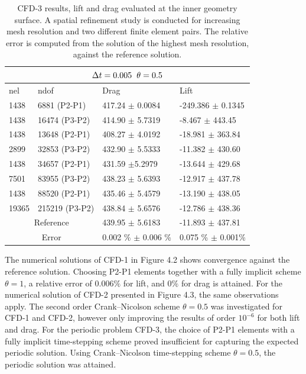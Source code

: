 \begin{table}[h!]
\centering
\label{CFD-32 Results}
 \begin{tabular}{ |p{1cm}||p{2.9cm}|p{3.3cm}|p{3.3cm}|}
  \hline
  \multicolumn{4}{|c|}{$\Delta t = 0.005 \hspace{2mm} \theta = 0.5$} \\
   \hline
nel & ndof & Drag  & Lift \\
\hline
 1438    & 6881  (P2-P1)   &  417.24  $\pm$  0.0084 & -249.386   $\pm$ 0.1345  \\
 1438    & 16474 (P3-P2)   & 414.90     $\pm$  5.7319 & -8.467 $\pm$  443.45  \\
\hline
 1438    &13648  (P2-P1)   & 408.27   $\pm$ 4.0192 & -18.981   $\pm$ 363.84 \\
 2899    &  32853 (P3-P2)   & 432.90      $\pm$  5.5333 & -11.382      $\pm$  430.60 \\
 \hline
 1438    & 34657  (P2-P1)   & 431.59 $\pm$5.2979 & -13.644   $\pm$ 429.68 \\
 7501    & 83955 (P3-P2)  & 438.23      $\pm$  5.6393 & -12.917 $\pm$  437.78 \\
 \hline
 1438    & 88520  (P2-P1)   & 435.46  $\pm$ 5.4579 & -13.190   $\pm$ 438.05 \\
 19365   & 215219 (P3-P2)  & 438.84    $\pm$  5.6576 & -12.786      $\pm$  438.36 \\
\hline
 \multicolumn{2}{|c|}{Reference}  & 439.95 $\pm$ 5.6183 & -11.893 $\pm$ 437.81\\
 \hline
  \multicolumn{2}{|c|}{Error}  & 0.002 \% $\pm$ 0.006 \% & 0.075 \% $\pm$ 0.001\% \\
  \hline
\end{tabular}
\caption{CFD-3 results, lift and drag evaluated at the inner geometry surface. A spatial refinement study is conducted for increasing mesh resolution and two different finite element pairs. The relative error is computed from the solution of the highest mesh resolution, against the reference solution.}
\label{table:cfd32}
\end{table}
\newpage

The numerical solutions of CFD-1 in Figure 4.2 shows convergence against the reference solution. Choosing P2-P1 elements together with a fully implicit scheme $\theta = 1$, a relative error of $0.006 \%$ for lift, and $0\%$ for drag is attained. For the numerical solution of CFD-2 presented in Figure 4.3, the same observations apply. The second order Crank–Nicolson scheme  $\theta = 0.5$ was investigated for CFD-1 and CFD-2, however only improving the results of order $10^{-6}$ for both lift and drag. For the periodic problem CFD-3, the choice of  P2-P1 elements with a fully implicit time-stepping scheme proved insufficient for capturing the expected periodic solution. Using Crank–Nicolson time-stepping scheme $\theta = 0.5$, the periodic solution was attained. 

